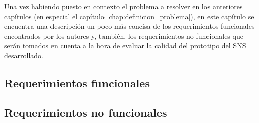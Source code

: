 Una vez habiendo puesto en contexto el problema a resolver en los anteriores capítulos (en especial el capítulo \ref{chap:definicion_problema}), en este capítulo se encuentra una descripción un poco más concisa de los requerimientos funcionales encontrados por los autores y, también, los requerimientos no funcionales que serán tomados en cuenta a la hora de evaluar la calidad del prototipo del SNS desarrollado.

\subsection{Requerimientos funcionales}
\label{subsec:requerimientos_funcionales}


\subsection{Requerimientos no funcionales}
\label{subsec:requerimientos_no_funcionales}

